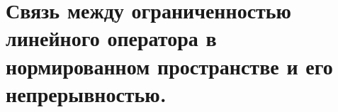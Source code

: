 \documentclass[../main.tex]{subfiles}
\begin{document}
\newpage
\section{Связь между ограниченностью линейного оператора в нормированном пространстве и его непрерывностью.}
\end{document}
